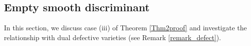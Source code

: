 \documentclass[12pt]{amsart}
\begin{document}

\subsection{Empty smooth discriminant}\label{sec_smoothfib}


In this section, we discuss case (iii) of Theorem \ref{Thm2proof} and investigate the relationship with dual defective varieties (see Remark \ref{remark_defect}). 
\end{document}
